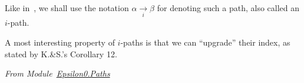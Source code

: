Like in~\cite{KS81}, we shall use the notation $\alpha \xrightarrow[i]{} \beta$ for denoting such a path, also called an $i$-path.














A most interesting property of $i$-paths is that we can ``upgrade'' their index, as stated by K.\&S.'s Corollary 12.


\emph{From
  Module~\href{../theories/html/hydras.Epsilon0.Paths.html}{Epsilon0.Paths}}

